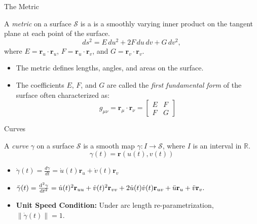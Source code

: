 \documentclass{beamer}
\newcommand{\R}{\mathbb{R}}
\begin{document}
\begin{frame}{The Metric}
	\begin{definition}[Metric]\label{def:metric}
		A \emph{metric} on a surface $\mathcal{S}$ is a is a smoothly varying inner product on the tangent plane at each point of the surface.
		\[
			ds^2 = E\,du^2 + 2F\,du\,dv + G\,dv^2,
		\]
		where $E = \mathbf{r}_u\cdot\mathbf{r}_u$, $F = \mathbf{r}_u\cdot\mathbf{r}_v$, and $G = \mathbf{r}_v\cdot\mathbf{r}_v$.
	\end{definition}
	\hfill 
	\pause 
	\begin{itemize}[<+->]
		\item The metric defines lengths, angles, and areas on the surface.
		\item The coefficients $E$, $F$, and $G$ are called the \emph{first fundamental form} of the surface often characterized as:
		\[
			g_{\mu\nu} = \mathbf{r}_\mu \cdot \mathbf{r}_\nu =
			\begin{bmatrix}
				E & F \\
				F & G
			\end{bmatrix} 
		\] 
	\end{itemize}
\end{frame}

\begin{frame}{Curves}
	\begin{definition}[Curve]\label{def:curve}
		A \emph{curve} $\gamma$ on a surface $\mathcal{S}$ is a smooth map $\gamma: I \to \mathcal{S}$, where $I$ is an interval in $\R$.
		\[
		    \gamma(t) = \mathbf{r}(u(t),v(t))
		\]
	\end{definition}
	\vspace{1ex}
	\begin{itemize}[<+->]
		\item $\dot{\gamma}(t) = \frac{d\gamma}{dt} = \dot{u}(t)\mathbf{r}_u  + \dot{v}(t)\mathbf{r}_v$
		\item $\ddot{\gamma}(t) = \dv[2]{\gamma}{t} = \dot{u}(t)^{2}\mathbf{r}_{uu} + \dot{v}(t)^{2}\mathbf{r}_{vv} + 2\dot{u}(t)\dot{v}(t)\mathbf{r}_{uv} + \ddot{u}\mathbf{r}_{u} + \ddot{v}\mathbf{r}_{v}.$
		\item \textbf{Unit Speed Condition:} Under arc length re-parametrization, $\|\dot{\gamma}(t)\| = 1$.
	\end{itemize}	
\end{frame}
\end{document}
